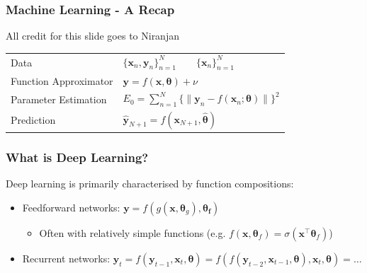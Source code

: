 \documentclass[]{article}
\begin{document}
\begin{frame}
\frametitle{Machine Learning - A Recap}
{\tiny All credit for this slide goes to Niranjan}\par
\vspace{5mm}
\begin{tabular}{ll}
Data & $\{\bm{x}_n, \bm{y}_n\}^N_{n=1} \qquad \{\bm{x}_n\}^N_{n=1}$
\vspace{3mm} \\ \pause
Function Approximator & $\bm{y} = f (\bm{x}, \bm{\theta}) + \nu$
\vspace{3mm} \\ \pause
Parameter Estimation & $E_0 = \sum^N_{n=1} \{\|\bm{y}_n - f (\bm{x}_n; \bm{\theta})\|\}^2$
\vspace{3mm} \\ \pause
Prediction & $\bm{\hat y}_{N+1} = f(\bm{x}_{N+1}, \bm{\hat \theta})$
\end{tabular}
\vspace{5mm}
\end{frame}

\begin{frame}
\frametitle{What is Deep Learning?}

Deep learning is primarily characterised by function compositions: \\ \vspace{10mm}
\begin{itemize}
	\item<2-> Feedforward networks: $\bm{y} = f (g(\bm{x}, \bm\theta_g), \bm{\theta_f})$
	\begin{itemize}
		\item Often with relatively simple functions (e.g. $f(\bm x, \bm{\theta}_f) = \sigma(\bm{x}^\top \bm{\theta}_f)$)
	\end{itemize} \vspace{3mm}
	\item<3-> Recurrent networks: $\bm y_t = f(\bm y_{t-1}, \bm x_t, \bm\theta) = f(f(\bm y_{t-2}, \bm x_{t-1}, \bm\theta), \bm x_t, \bm\theta) = \dots$
\end{itemize}
\vspace{10mm}

\end{frame}
\end{document}
